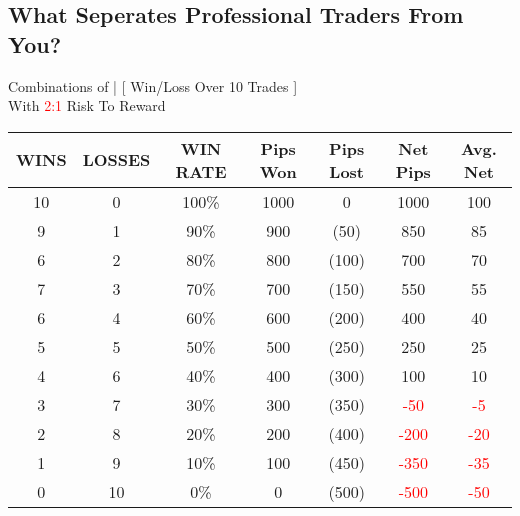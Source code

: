 \documentclass[10pt]{article}
\begin{document}
\begin{center}
\subsection*{What Seperates Professional Traders From You?}
\vspace{0.1cm}

\small{Combinations of | [ Win/Loss Over 10 Trades ]} \\
\small{With \textcolor{red}{2:1} Risk To Reward}
\vspace{0.4cm}

\renewcommand{\arraystretch}{1.5} %
\setlength{\tabcolsep}{10pt} %

\begin{tabular}{|c|c|c|c|c|c|c|}
  \hline
  WINS & LOSSES & WIN RATE & Pips Won & Pips Lost & Net Pips & Avg. Net \\ 
  \hline
  10 & 0 & 100\%  & 1000   & 0     & 1000 & 100 \\  
  \hline                                 
  9 & 1  & 90\%   & 900    & (50)  & 850  & 85 \\  
  \hline                           
  6 & 2  & 80\%   & 800    & (100) & 700  & 70 \\  
  \hline                          
  7 & 3  & 70\%   & 700    & (150) & 550  & 55 \\  
  \hline                         
  6 & 4  & 60\%   & 600    & (200) & 400  & 40 \\  
  \hline                     
  5 & 5  & 50\%   & 500    & (250) & 250  & 25 \\  
  \hline                
\rowcolor{yellow!60} 4 & 6  & 40\%   & 400    & (300) & 100  & 10 \\  
 \hline       
\rowcolor{yellow!60} 3 & 7  & 30\%   & 300    &(350)& \textcolor{red}{-50} & \textcolor{red}{-5} \\
\hline                      
  2 & 8  & 20\%   & 200    & (400) & \textcolor{red}{-200} & \textcolor{red}{-20} \\  
\hline                    
  1 & 9  & 10\%   & 100    & (450) & \textcolor{red}{-350} & \textcolor{red}{-35} \\  
\hline                     
  0 & 10 & 0\%    & 0      & (500) & \textcolor{red}{-500} & \textcolor{red}{-50} \\  
\hline
\end{tabular}
\end{center}
\vspace{0.1cm}
\end{document}
